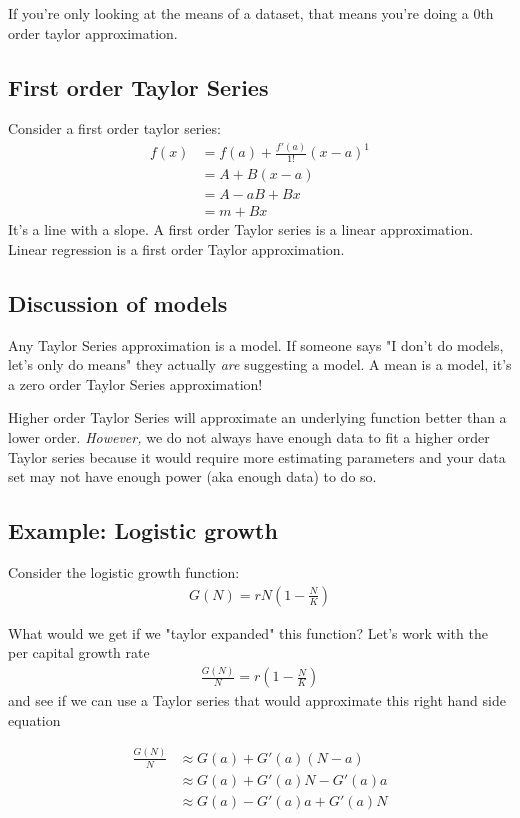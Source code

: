 \documentclass{article}
\begin{document}
If you're only looking at the means of a dataset, that means you're doing a 0th order taylor approximation.

\subsection{First order Taylor Series}

Consider a first order taylor series: 
\begin{align}
    f(x) &= f(a) + \frac{f'(a)}{1!}(x-a)^1 \\
    &= A + B (x-a) \\
    &= A -aB + Bx\\
    &= m + Bx
\end{align}
It's a line with a slope. A first order Taylor series is a linear approximation. Linear regression is a first order Taylor approximation. \\

\subsection{Discussion of models}
Any Taylor Series approximation is a model. If someone says "I don't do models, let's only do means" they actually \textit{are} suggesting a model. A mean is a model, it's a zero order Taylor Series approximation! 

Higher order Taylor Series will approximate an underlying function better than a lower order. \textit{However,} we do not always have enough data to fit a higher order Taylor series because it would require more estimating parameters and your data set may not have enough power (aka enough data) to do so. 

\subsection{Example: Logistic growth}
Consider the logistic growth function: 
\begin{align}
    G(N) = rN (1 - \frac{N}{K})
\end{align}

What would we get if we "taylor expanded" this function? Let's work with the per capital growth rate
\begin{align}
    \frac{G(N)}{N} = r(1 - \frac{N}{K}) \label{per_cap}
\end{align}
and see if we can use a Taylor series that would approximate this right hand side equation

\begin{align}
    \frac{G(N)}{N} &\approx G(a) + G'(a) (N-a)\\
    &\approx G(a) + G'(a)N - G'(a)a \\
    & \approx G(a) - G'(a)a + G'(a) N
\end{align}
\end{document}
